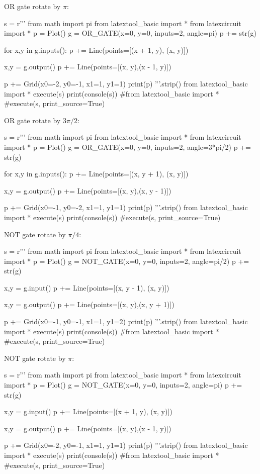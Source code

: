 \newpage
OR gate rotate by $\pi$:
\begin{python}
s = r'''
from math import pi
from latextool_basic import *
from latexcircuit import *
p = Plot()
g = OR_GATE(x=0, y=0, inputs=2, angle=pi)
p += str(g)

for x,y in g.inputs():
    p += Line(points=[(x + 1, y), (x, y)])

x,y = g.output()
p += Line(points=[(x, y),(x - 1, y)])

p += Grid(x0=-2, y0=-1, x1=1, y1=1)
print(p)
'''.strip()
from latextool_basic import *
execute(s)
print(console(s))
#from latextool_basic import *
#execute(s, print_source=True)
\end{python}


\newpage
OR gate rotate by $3\pi/2$:
\begin{python}
s = r'''
from math import pi
from latextool_basic import *
from latexcircuit import *
p = Plot()
g = OR_GATE(x=0, y=0, inputs=2, angle=3*pi/2)
p += str(g)

for x,y in g.inputs():
    p += Line(points=[(x, y + 1), (x, y)])

x,y = g.output()
p += Line(points=[(x, y),(x, y - 1)])

p += Grid(x0=-1, y0=-2, x1=1, y1=1)
print(p)
'''.strip()
from latextool_basic import *
execute(s)
print(console(s))
#execute(s, print_source=True)
\end{python}





\newpage
NOT gate rotate by $\pi/4$:
\begin{python}
s = r'''
from math import pi
from latextool_basic import *
from latexcircuit import *
p = Plot()
g = NOT_GATE(x=0, y=0, inputs=2, angle=pi/2)
p += str(g)

x,y = g.input()
p += Line(points=[(x, y - 1), (x, y)])

x,y = g.output()
p += Line(points=[(x, y),(x, y + 1)])

p += Grid(x0=-1, y0=-1, x1=1, y1=2)
print(p)
'''.strip()
from latextool_basic import *
execute(s)
print(console(s))
#from latextool_basic import *
#execute(s, print_source=True)
\end{python}


\newpage
NOT gate rotate by $\pi$:
\begin{python}
s = r'''
from math import pi
from latextool_basic import *
from latexcircuit import *
p = Plot()
g = NOT_GATE(x=0, y=0, inputs=2, angle=pi)
p += str(g)

x,y = g.input()
p += Line(points=[(x + 1, y), (x, y)])

x,y = g.output()
p += Line(points=[(x, y),(x - 1, y)])

p += Grid(x0=-2, y0=-1, x1=1, y1=1)
print(p)
'''.strip()
from latextool_basic import *
execute(s)
print(console(s))
#from latextool_basic import *
#execute(s, print_source=True)
\end{python}




